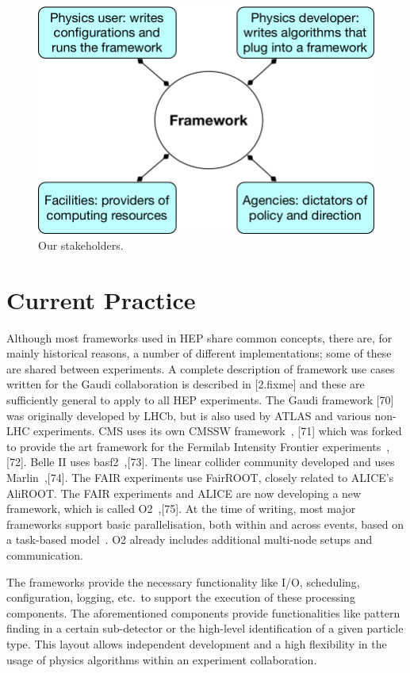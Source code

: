 \documentclass[12pt,a4paper]{article}
\begin{document}
\begin{figure}[hbt] %
\centering
\includegraphics[width=.75\textwidth]{stakeholders.pdf}
\caption{Our stakeholders. \label{fig:stakeholders}}
\end{figure}


\section{Current Practice}
\label{sec:current-practice}

Although most frameworks used in HEP share common concepts, there are,
for mainly historical reasons, a number of different implementations;
some of these are shared between experiments. A complete description
of framework use cases written for the Gaudi collaboration is
described in {[}2.fixme{]} and these are sufficiently general to apply
to all HEP experiments. The Gaudi framework {[}70{]} was originally
developed by LHCb, but is also used by ATLAS and various non-LHC
experiments. CMS uses its own CMSSW framework~\cite{Bayatian:2006nff},
{[}71{]} which was forked to provide the art framework for the Fermilab
Intensity Frontier experiments~\cite{Green:2012gv},{[}72{]}.  Belle II uses
basf2~\cite{1742-6596-331-3-032024},{[}73{]}. The linear collider community
developed and uses Marlin~\cite{Gaede:2006pj},{[}74{]}. The FAIR experiments
use FairROOT, closely related to ALICE's AliROOT. The FAIR experiments
and ALICE are now developing a new framework, which is called
O2~\cite{O2},{[}75{]}. At the time of writing, most major frameworks support
basic parallelisation, both within and across events, based on a
task-based model~\cite{Jones:2015soc,Clemencic:2015paa}. O2 already
includes additional multi-node setups and communication.

The frameworks provide the necessary functionality like I/O,
scheduling, configuration, logging, etc.\ to support the execution of
these processing components. The aforementioned components provide
functionalities like pattern finding in a certain sub-detector or the
high-level identification of a given particle type. This layout allows
independent development and a high flexibility in the usage of physics
algorithms within an experiment collaboration.
\end{document}
